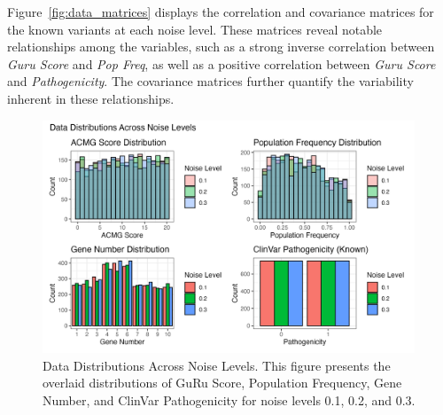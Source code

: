 Figure~\ref{fig:data_matrices} displays the correlation and covariance matrices for the known variants at each noise level. These matrices reveal notable relationships among the variables, such as a strong inverse correlation between \emph{Guru Score} and \emph{Pop Freq}, as well as a positive correlation between \emph{Guru Score} and \emph{Pathogenicity}. The covariance matrices further quantify the variability inherent in these relationships.

\begin{figure}[h]
    \centering
    \includegraphics[width=0.99\textwidth]{../figures/data_dist.png}
    \caption{Data Distributions Across Noise Levels. This figure presents the overlaid distributions of GuRu Score, Population Frequency, Gene Number, and ClinVar Pathogenicity for noise levels 0.1, 0.2, and 0.3.}
    \label{fig:data_dist}
\end{figure}

